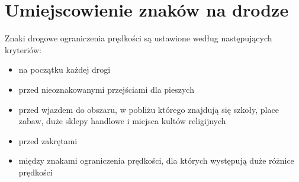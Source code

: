 \newpage
\section{Umiejscowienie znaków na drodze}
\label{sec:speedLimitLocalization}
Znaki drogowe ograniczenia prędkości są ustawione według następujących kryteriów:
\begin{itemize}
\item na początku każdej drogi
\item przed nieoznakowanymi przejściami dla pieszych
\item przed wjazdem do obszaru, w pobliżu którego znajdują się szkoły, place zabaw, duże sklepy handlowe i miejsca kultów religijnych
\item przed zakrętami
\item między znakami ograniczenia prędkości, dla których występują duże różnice prędkości
\end{itemize}


